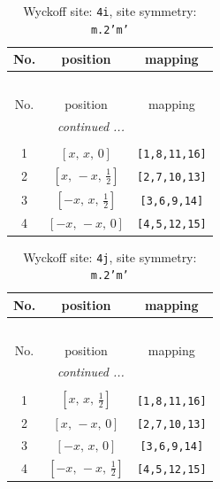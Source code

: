 \documentclass[fleqn,8pt]{jsarticle}
\begin{document}
\renewcommand{\arraystretch}{1.2}
\begin{longtable}{ccc}
\caption{Wyckoff site: {\tt 4i}, site symmetry: {\tt m.2'm'}}
 \\
 \hline \hline
No. & position & mapping \\ \hline \endfirsthead

\multicolumn{2}{l}{\tablename\ \thetable{}} \\
 \hline \hline
No. & position & mapping \\ \hline \endhead

 \hline \hline
\multicolumn{2}{r}{\footnotesize\it continued ...} \\ \endfoot

 \hline \hline
\multicolumn{2}{r}{} \\ \endlastfoot

1 & $\left[ x,\, x,\, 0 \right]$ & {\tt [1,8,11,16]} \\ \hline
2 & $\left[ x,\, - x,\, \frac{1}{2} \right]$ & {\tt [2,7,10,13]} \\ \hline
3 & $\left[ - x,\, x,\, \frac{1}{2} \right]$ & {\tt [3,6,9,14]} \\ \hline
4 & $\left[ - x,\, - x,\, 0 \right]$ & {\tt [4,5,12,15]} \\
\end{longtable}
\renewcommand{\arraystretch}{1.2}
\begin{longtable}{ccc}
\caption{Wyckoff site: {\tt 4j}, site symmetry: {\tt m.2'm'}}
 \\
 \hline \hline
No. & position & mapping \\ \hline \endfirsthead

\multicolumn{2}{l}{\tablename\ \thetable{}} \\
 \hline \hline
No. & position & mapping \\ \hline \endhead

 \hline \hline
\multicolumn{2}{r}{\footnotesize\it continued ...} \\ \endfoot

 \hline \hline
\multicolumn{2}{r}{} \\ \endlastfoot

1 & $\left[ x,\, x,\, \frac{1}{2} \right]$ & {\tt [1,8,11,16]} \\ \hline
2 & $\left[ x,\, - x,\, 0 \right]$ & {\tt [2,7,10,13]} \\ \hline
3 & $\left[ - x,\, x,\, 0 \right]$ & {\tt [3,6,9,14]} \\ \hline
4 & $\left[ - x,\, - x,\, \frac{1}{2} \right]$ & {\tt [4,5,12,15]} \\
\end{longtable}
\end{document}

